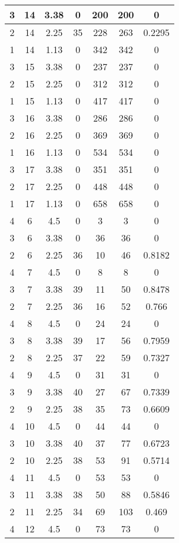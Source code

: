 \documentclass[letterpaper, 12pt]{article}
\begin{document}
\begin{longtable}{|c|c|c|c|c|c|c|}
\hline
3 & 14 & 3.38 & 0 & 200 & 200 & 0 \\
\hline
2 & 14 & 2.25 & 35 & 228 & 263 & 0.2295 \\
\hline
1 & 14 & 1.13 & 0 & 342 & 342 & 0 \\
\hline
3 & 15 & 3.38 & 0 & 237 & 237 & 0 \\
\hline
2 & 15 & 2.25 & 0 & 312 & 312 & 0 \\
\hline
1 & 15 & 1.13 & 0 & 417 & 417 & 0 \\
\hline
3 & 16 & 3.38 & 0 & 286 & 286 & 0 \\
\hline
2 & 16 & 2.25 & 0 & 369 & 369 & 0 \\
\hline
1 & 16 & 1.13 & 0 & 534 & 534 & 0 \\
\hline
3 & 17 & 3.38 & 0 & 351 & 351 & 0 \\
\hline
2 & 17 & 2.25 & 0 & 448 & 448 & 0 \\
\hline
1 & 17 & 1.13 & 0 & 658 & 658 & 0 \\
\hline
4 & 6 & 4.5 & 0 & 3 & 3 & 0 \\
\hline
3 & 6 & 3.38 & 0 & 36 & 36 & 0 \\
\hline
2 & 6 & 2.25 & 36 & 10 & 46 & 0.8182 \\
\hline
4 & 7 & 4.5 & 0 & 8 & 8 & 0 \\
\hline
3 & 7 & 3.38 & 39 & 11 & 50 & 0.8478 \\
\hline
2 & 7 & 2.25 & 36 & 16 & 52 & 0.766 \\
\hline
4 & 8 & 4.5 & 0 & 24 & 24 & 0 \\
\hline
3 & 8 & 3.38 & 39 & 17 & 56 & 0.7959 \\
\hline
2 & 8 & 2.25 & 37 & 22 & 59 & 0.7327 \\
\hline
4 & 9 & 4.5 & 0 & 31 & 31 & 0 \\
\hline
3 & 9 & 3.38 & 40 & 27 & 67 & 0.7339 \\
\hline
2 & 9 & 2.25 & 38 & 35 & 73 & 0.6609 \\
\hline
4 & 10 & 4.5 & 0 & 44 & 44 & 0 \\
\hline
3 & 10 & 3.38 & 40 & 37 & 77 & 0.6723 \\
\hline
2 & 10 & 2.25 & 38 & 53 & 91 & 0.5714 \\
\hline
4 & 11 & 4.5 & 0 & 53 & 53 & 0 \\
\hline
3 & 11 & 3.38 & 38 & 50 & 88 & 0.5846 \\
\hline
2 & 11 & 2.25 & 34 & 69 & 103 & 0.469 \\
\hline
4 & 12 & 4.5 & 0 & 73 & 73 & 0 \\

\end{longtable}
\end{document}
